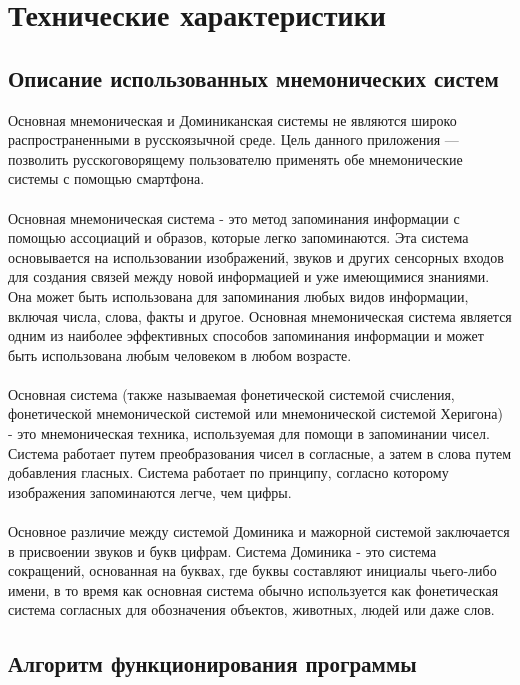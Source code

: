 \documentclass[draft]{article}
\begin{document}
\section{Технические характеристики}
\subsection{Описание использованных мнемонических систем}
Основная мнемоническая и Доминиканская системы не являются широко распространенными в русскоязычной среде. Цель данного приложения — позволить русскоговорящему пользователю применять обе мнемонические системы с помощью смартфона.\\
~\\
Основная мнемоническая система - это метод запоминания информации с помощью ассоциаций и образов, которые легко запоминаются. Эта система основывается на использовании изображений, звуков и других сенсорных входов для создания связей между новой информацией и уже имеющимися знаниями. Она может быть использована для запоминания любых видов информации, включая числа, слова, факты и другое. Основная мнемоническая система является одним из наиболее эффективных способов запоминания информации и может быть использована любым человеком в любом возрасте.\\
~\\
Основная система (также называемая фонетической системой счисления, фонетической мнемонической системой или мнемонической системой Херигона) - это мнемоническая техника, используемая для помощи в запоминании чисел. Система работает путем преобразования чисел в согласные, а затем в слова путем добавления гласных. Система работает по принципу, согласно которому изображения запоминаются легче, чем цифры.\\
~\\
Основное различие между системой Доминика и мажорной системой заключается в присвоении звуков и букв цифрам. Система Доминика - это система сокращений, основанная на буквах, где буквы составляют инициалы чьего-либо имени, в то время как основная система обычно используется как фонетическая система согласных для обозначения объектов, животных, людей или даже слов.
\subsection{Алгоритм функционирования программы}
\end{document}
